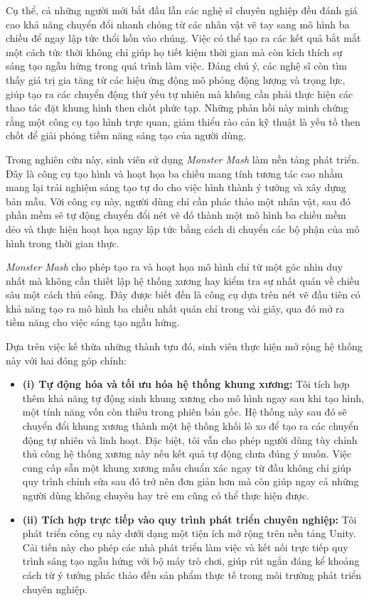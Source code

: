 \documentclass{report}
\begin{document}
Cụ thể, cả những người mới bắt đầu lẫn các nghệ sĩ chuyên nghiệp đều đánh giá cao khả năng chuyển đổi nhanh chóng từ các nhân vật vẽ tay sang mô hình ba chiều để ngay lập tức thổi hồn vào chúng. Việc có thể tạo ra các kết quả bắt mắt một cách tức thời không chỉ giúp họ tiết kiệm thời gian mà còn kích thích sự sáng tạo ngẫu hứng trong quá trình làm việc. Đáng chú ý, các nghệ sĩ còn tìm thấy giá trị gia tăng từ các hiệu ứng động mô phỏng động lượng và trọng lực, giúp tạo ra các chuyển động thứ yếu tự nhiên mà không cần phải thực hiện các thao tác đặt khung hình then chốt phức tạp. Những phản hồi này minh chứng rằng một công cụ tạo hình trực quan, giảm thiểu rào cản kỹ thuật là yếu tố then chốt để giải phóng tiềm năng sáng tạo của người dùng.

Trong nghiên cứu này, sinh viên sử dụng \textit{Monster Mash} \citep{monstermash} làm nền tảng phát triển. Đây là công cụ tạo hình và hoạt họa ba chiều mang tính tương tác cao nhằm mang lại trải nghiệm sáng tạo tự do cho việc hình thành ý tưởng và xây dựng bản mẫu. Với công cụ này, người dùng chỉ cần phác thảo một nhân vật, sau đó phần mềm sẽ tự động chuyển đổi nét vẽ đó thành một mô hình ba chiều mềm dẻo và thực hiện hoạt họa ngay lập tức bằng cách di chuyển các bộ phận của mô hình trong thời gian thực.

\textit{Monster Mash }cho phép tạo ra và hoạt họa mô hình chỉ từ một góc nhìn duy nhất mà không cần thiết lập hệ thống xương hay kiểm tra sự nhất quán về chiều sâu một cách thủ công. Đây được biết đến là công cụ dựa trên nét vẽ đầu tiên có khả năng tạo ra mô hình ba chiều nhất quán chỉ trong vài giây, qua đó mở ra tiềm năng cho việc sáng tạo ngẫu hứng.

Dựa trên việc kế thừa những thành tựu đó, sinh viên thực hiện mở rộng hệ thống này với hai đóng góp chính:

\begin{itemize}
\item \textbf{(i) Tự động hóa và tối ưu hóa hệ thống khung xương:} Tôi tích hợp thêm khả năng tự động sinh khung xương cho mô hình ngay sau khi tạo hình, một tính năng vốn còn thiếu trong phiên bản gốc. Hệ thống này sau đó sẽ chuyển đổi khung xương thành một hệ thống khối lò xo để tạo ra các chuyển động tự nhiên và linh hoạt. Đặc biệt, tôi vẫn cho phép người dùng tùy chỉnh thủ công hệ thống xương này nếu kết quả tự động chưa đúng ý muốn. Việc cung cấp sẵn một khung xương mẫu chuẩn xác ngay từ đầu không chỉ giúp quy trình chỉnh sửa sau đó trở nên đơn giản hơn mà còn giúp ngay cả những người dùng không chuyên hay trẻ em cũng có thể thực hiện được.
\item \textbf{(ii) Tích hợp trực tiếp vào quy trình phát triển chuyên nghiệp:} Tôi phát triển công cụ này dưới dạng một tiện ích mở rộng trên nền tảng Unity. Cải tiến này cho phép các nhà phát triển làm việc và kết nối trực tiếp quy trình sáng tạo ngẫu hứng với bộ máy trò chơi, giúp rút ngắn đáng kể khoảng cách từ ý tưởng phác thảo đến sản phẩm thực tế trong môi trường phát triển chuyên nghiệp.
\end{itemize}
\end{document}
